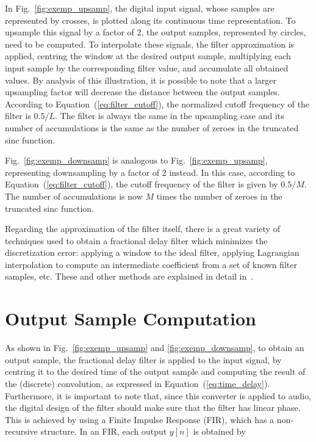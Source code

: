 In Fig.~\ref{fig:exemp_upsamp}, the digital input signal, whose samples are
represented by crosses, is plotted along its continuous time representation. To
upsample this signal by a factor of 2, the output samples, represented by
circles, need to be computed. To interpolate these signals, the filter
approximation is applied, centring the window at the desired output sample,
multiplying each input sample by the corresponding filter value, and accumulate
all obtained values. By analysis of this illustration, it is possible to note
that a larger upsampling factor will decrease the distance between the output
samples. According to Equation~(\ref{eq:filter_cutoff}), the normalized
cutoff frequency of the filter is $0.5/L$. The filter is always the same in the
upsampling case and its number of accumulations is the same as the number of
zeroes in the truncated sinc function.

Fig.~\ref{fig:exemp_downsamp} is analogous to Fig.~\ref{fig:exemp_upsamp},
representing downsampling by a factor of 2 instead. In this case, according to
Equation~(\ref{eq:filter_cutoff}), the cutoff frequency of the filter is
given by $0.5/M$.  The number of accumulations is now $M$ times the number of
zeroes in the truncated sinc function.

Regarding the approximation of the filter itself, there is a great variety of
techniques used to obtain a fractional delay filter which minimizes the
discretization error: applying a window to the ideal filter, applying Lagrangian
interpolation to compute an intermediate coefficient from a set of known filter
samples, etc. These and other methods are explained in detail
in~\cite{kootsookos:firapproxfd,Tseng:firfdsnr,laakso:pfdfilter,Yardin:Perffdf}.


\section{Output Sample Computation}
\label{section:output_computation}

As shown in Fig.~\ref{fig:exemp_upsamp} and \ref{fig:exemp_downsamp}, to obtain
an output sample, the fractional delay filter is applied to the input signal, by
centring it to the desired time of the output sample and computing the result of
the (discrete) convolution, as expressed in Equation~(\ref{eq:time_delay}).
Furthermore, it is important to note that, since this converter is applied to
audio, the digital design of the filter should make sure that the filter has
linear phase. This is achieved by using a Finite Impulse Response (FIR), which
has a non-recursive structure. In an FIR, each output $y[n]$ is obtained by

